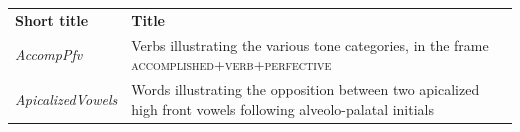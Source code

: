 \begin{table}[H]
  {\renewcommand{\arraystretch}{1.35}
    \begin{tabularx}{\textwidth}{ @{}l Q >{\raggedleft\arraybackslash}P{20mm}}
  \textbf{Short title} & \textbf{Title} &  \\  
      \textit{AccompPfv} & Verbs illustrating the various tone categories, in the frame \textsc{accomplished+verb+perfective} &  \\
      \textit{ApicalizedVowels} & Words illustrating the opposition between two apicalized high front vowels following alveolo-palatal initials &  \\
    \end{tabularx}}
\end{table}

